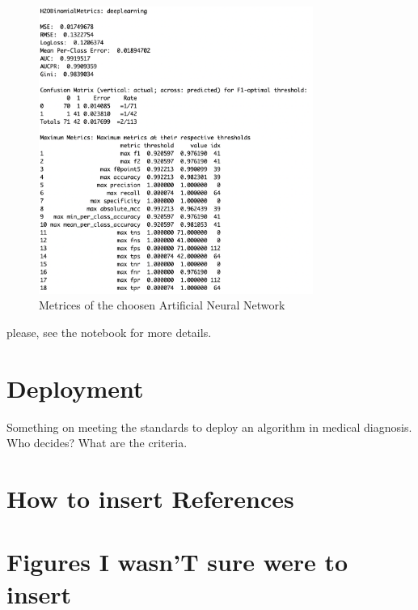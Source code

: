 \documentclass[]{article}
\begin{document}
\begin{figure}
    \centering
    \includegraphics[width=0.8\textwidth]{images/h2o_model_performance.png}
    \caption{Metrices of the choosen Artificial Neural Network}
    \label{fig:h2o_model_performance}
\end{figure}

please, see the notebook for more details.

\section{Deployment}\label{deployment}

Something on meeting the standards to deploy an algorithm in medical
diagnosis. Who decides? What are the criteria.

\section{How to insert References}\label{how-to-insert-references}

\cite{nnet}

\cite{otexts}

\section{Figures I wasn'T sure were to
insert}\label{figures-i-wasnt-sure-were-to-insert}
\end{document}
